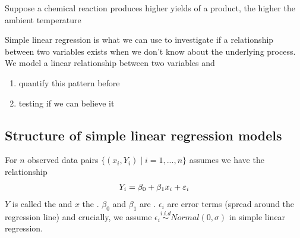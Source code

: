 \begin{example}
	Suppose a chemical reaction produces higher yields of a product, the higher the ambient temperature
	\begin{center}
	\end{center}
	Simple linear regression is what we can use to investigate if a relationship between two variables exists when we don't know about the underlying process. We model a linear relationship between two variables and
	\begin{enumerate}[label=(\alph*)]
		\item quantify this pattern before
		\item testing if we can believe it
	\end{enumerate}
\end{example}

\subsection{Structure of simple linear regression models}

\begin{definition}
	For $n$ observed data pairs $\{(x_i,Y_i)\mid i=1,...,n\}$  assumes we have the relationship
	\begin{align}
		Y_i = \beta_0 + \beta_1x_i + \epsilon_i\notag
	\end{align}
	$Y$ is called the  and $x$ the . $\beta_0$ and $\beta_1$ are . $\epsilon_i$ are error terms (spread around the regression line) and crucially, we assume $\epsilon_i\overset{i.i.d}{\sim}Normal(0,\sigma)$ in simple linear regression.
\end{definition}

